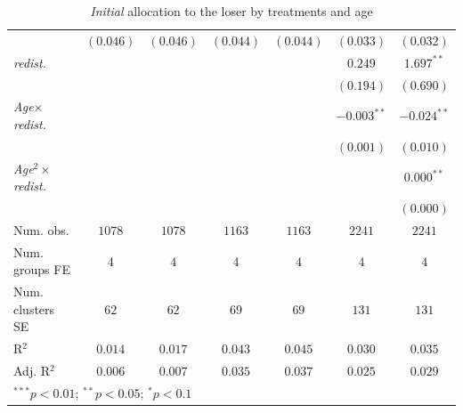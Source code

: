 \begin{table}[htpb]
\begin{center}
\begin{footnotesize}
\begin{tabular}{l c c c c c c}
                                       & $(0.046)$     & $(0.046)$     & $(0.044)$      & $(0.044)$      & $(0.033)$      & $(0.032)$      \\
\textit{redist.}                       &               &               &                &                & $0.249$        & $1.697^{**}$   \\
                                       &               &               &                &                & $(0.194)$      & $(0.690)$      \\
\textit{Age}$\times$\textit{redist.}   &               &               &                &                & $-0.003^{**}$  & $-0.024^{**}$  \\
                                       &               &               &                &                & $(0.001)$      & $(0.010)$      \\
\textit{Age}$^2\times$\textit{redist.} &               &               &                &                &                & $0.000^{**}$   \\
                                       &               &               &                &                &                & $(0.000)$      \\
\midrule
Num. obs.                              & $1078$        & $1078$        & $1163$         & $1163$         & $2241$         & $2241$         \\
Num. groups FE                         & $4$           & $4$           & $4$            & $4$            & $4$            & $4$            \\
Num. clusters SE                       & $62$          & $62$          & $69$           & $69$           & $131$          & $131$          \\
R$^2$                                  & $0.014$       & $0.017$       & $0.043$        & $0.045$        & $0.030$        & $0.035$        \\
Adj. R$^2$                             & $0.006$       & $0.007$       & $0.035$        & $0.037$        & $0.025$        & $0.029$        \\
\bottomrule
\multicolumn{7}{l}{\footnotesize{$^{***}p<0.01$; $^{**}p<0.05$; $^{*}p<0.1$}}
\end{tabular}
\end{footnotesize}
\caption{\textit{Initial} allocation to the loser by treatments and age}
\label{table-age-initial}
\end{center}
\end{table}

